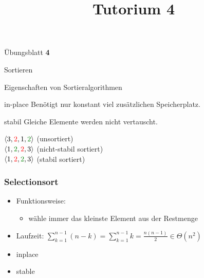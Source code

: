 
\title[Algorithmen I SS 14]{Tutorium 4}

\usepackage{alltt}





\begin{frame}
  \maketitle
\end{frame}

\begin{frame}
	\begin{center}
		\Huge
		Übungsblatt \textbf{4}
	\end{center}
\end{frame}

\begin{frame}
	\begin{center}
		\Huge
		Sortieren
	\end{center}
\end{frame}

\begin{frame}{Eigenschaften von Sortieralgorithmen}
	\begin{block}{in-place}
		Benötigt nur konstant viel zusätzlichen Speicherplatz.
	\end{block}
	\begin{block}{stabil}
		Gleiche Elemente werden nicht vertauscht.

		$\langle 3, {\color{red}{2}}, 1, {\color{english}{2}}\rangle$ (unsortiert)\\
		$\langle 1, {\color{english}{2}}, {\color{red}{2}}, 3\rangle$ (nicht-stabil sortiert)\\
		$\langle 1, {\color{red}{2}}, {\color{english}{2}}, 3\rangle$ (stabil sortiert)
	\end{block}
\end{frame}

\begin{frame}
	\frametitle{Selectionsort}
	\begin{itemize}
		\item Funktionsweise:
		\begin{itemize}
			\item wähle immer das kleinste Element aus der Restmenge
		\end{itemize}
		\item Laufzeit: $\sum_{k=1}^{n-1} (n - k) = \sum_{k=1}^{n-1} k = \frac{n(n-1)}{2} \in \Theta(n^2)$
		\item {\color{english}inplace}
		\item {\color{english}stable}
	\end{itemize}
\end{frame}

